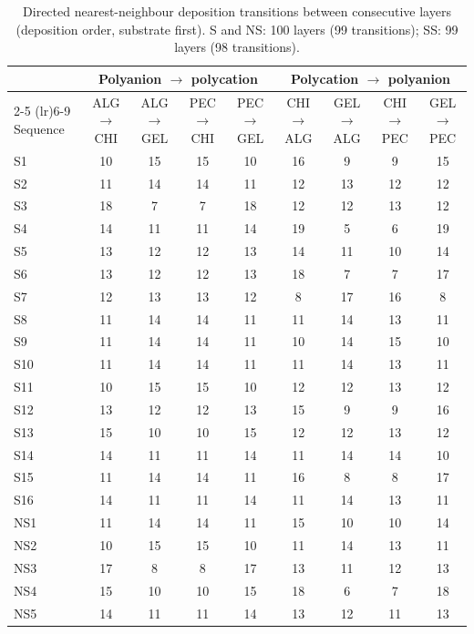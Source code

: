 \begin{table}[ht]
\centering
\small
\caption{Directed nearest-neighbour deposition transitions between consecutive layers (deposition order, substrate first). S and NS: 100 layers (99 transitions); SS: 99 layers (98 transitions).}
\label{tab:transitions}
\setlength{\tabcolsep}{4pt}
\begin{tabular}{lcccccccc}
\toprule
 & \multicolumn{4}{c}{Polyanion $\rightarrow$ polycation} & \multicolumn{4}{c}{Polycation $\rightarrow$ polyanion} \\
\cmidrule(lr){2-5} \cmidrule(lr){6-9}
Sequence & ALG$\rightarrow$CHI & ALG$\rightarrow$GEL & PEC$\rightarrow$CHI & PEC$\rightarrow$GEL & CHI$\rightarrow$ALG & GEL$\rightarrow$ALG & CHI$\rightarrow$PEC & GEL$\rightarrow$PEC \\
\midrule
S1 & 10 & 15 & 15 & 10 & 16 & 9 & 9 & 15 \\
S2 & 11 & 14 & 14 & 11 & 12 & 13 & 12 & 12 \\
S3 & 18 & 7 & 7 & 18 & 12 & 12 & 13 & 12 \\
S4 & 14 & 11 & 11 & 14 & 19 & 5 & 6 & 19 \\
S5 & 13 & 12 & 12 & 13 & 14 & 11 & 10 & 14 \\
S6 & 13 & 12 & 12 & 13 & 18 & 7 & 7 & 17 \\
S7 & 12 & 13 & 13 & 12 & 8 & 17 & 16 & 8 \\
S8 & 11 & 14 & 14 & 11 & 11 & 14 & 13 & 11 \\
S9 & 11 & 14 & 14 & 11 & 10 & 14 & 15 & 10 \\
S10 & 11 & 14 & 14 & 11 & 11 & 14 & 13 & 11 \\
S11 & 10 & 15 & 15 & 10 & 12 & 12 & 13 & 12 \\
S12 & 13 & 12 & 12 & 13 & 15 & 9 & 9 & 16 \\
S13 & 15 & 10 & 10 & 15 & 12 & 12 & 13 & 12 \\
S14 & 14 & 11 & 11 & 14 & 11 & 14 & 14 & 10 \\
S15 & 11 & 14 & 14 & 11 & 16 & 8 & 8 & 17 \\
S16 & 14 & 11 & 11 & 14 & 11 & 14 & 13 & 11 \\
\midrule
NS1 & 11 & 14 & 14 & 11 & 15 & 10 & 10 & 14 \\
NS2 & 10 & 15 & 15 & 10 & 11 & 14 & 13 & 11 \\
NS3 & 17 & 8 & 8 & 17 & 13 & 11 & 12 & 13 \\
NS4 & 15 & 10 & 10 & 15 & 18 & 6 & 7 & 18 \\
NS5 & 14 & 11 & 11 & 14 & 13 & 12 & 11 & 13 \\

\end{tabular}
\end{table}

